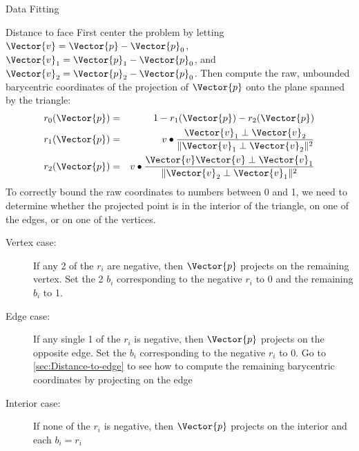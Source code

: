 \begin{plSection}{Data Fitting}
\begin{plSection}{Distance to face}
First center the problem by letting
$\Vector{v} = \Vector{p}-\Vector{p}_0$,
$\Vector{v}_1 = \Vector{p}_1-\Vector{p}_0$, 
and $\Vector{v}_2 = \Vector{p}_2-\Vector{p}_0$.
Then compute the raw, unbounded barycentric coordinates
of the projection of $\Vector{p}$ onto the plane
spanned by the triangle:
\begin{eqnarray}
r_0(\Vector{p}) & = & 1-r_1(\Vector{p})-r_2(\Vector{p})
\\
r_1(\Vector{p}) & = & v \bullet 
\frac{\Vector{v}_1 \perp \Vector{v}_2}
{\|\Vector{v}_1 \perp \Vector{v}_2\|^2}
\nonumber
\\
r_2(\Vector{p}) & = & v \bullet 
\frac{\Vector{v}\Vector{v} \perp \Vector{v}_1} 
{\|\Vector{v}_2 \perp \Vector{v}_1\|^2}
\nonumber
\end{eqnarray}
To correctly bound the raw coordinates to numbers between 0 and 1,
we need to determine whether the projected point is in
the interior of the triangle, on one of the edges,
or on one of the vertices.

\begin{description}

\item[Vertex case:]
If any 2 of the $r_i$ are negative,
then $\Vector{p}$ projects on the remaining vertex.
Set the 2 $b_i$ corresponding to the negative $r_i$
to 0 and the remaining $b_i$ to 1.

\item[Edge case:]
If any single 1 of the $r_i$ is negative,
then $\Vector{p}$ projects on the opposite edge.
Set the $b_i$ corresponding to the negative $r_i$
to 0.
Go to \cref{sec:Distance-to-edge} to see
how to compute the remaining barycentric coordinates
by projecting on the edge

\item[Interior case:]
If none of the $r_i$ is negative,
then $\Vector{p}$ projects on the interior
and each $b_i = r_i$

\end{description}
\end{plSection}%
\end{plSection}%
